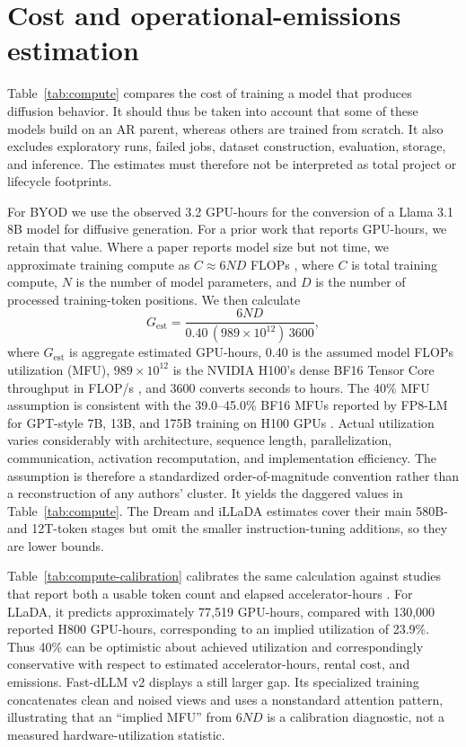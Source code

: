 \documentclass{article}
\begin{document}



\appendix
\section{Cost and operational-emissions estimation}
\label{app:cost}

Table~\ref{tab:compute} compares the cost of training a model that produces diffusion behavior. It should thus be taken into account that some of these models build on an AR parent, whereas others are trained from scratch. It also excludes exploratory runs, failed jobs, dataset construction, evaluation, storage, and inference. The estimates must therefore not be interpreted as total project or lifecycle footprints.

For BYOD we use the observed 3.2 GPU-hours for the conversion of a Llama 3.1 8B model for diffusive generation. For a prior work that reports GPU-hours, we retain that value. Where a paper reports model size but not time, we approximate training compute as $C\approx6ND$ FLOPs \citep{hoffmann2022chinchilla}, where $C$ is total training compute, $N$ is the number of model parameters, and $D$ is the number of processed training-token positions. We then calculate
\begin{equation}
G_{\mathrm{est}}=\frac{6ND}{0.40\,(989\times10^{12})\,3600},
\end{equation}
where $G_{\mathrm{est}}$ is aggregate estimated GPU-hours, 0.40 is the assumed model FLOPs utilization (MFU), $989\times10^{12}$ is the NVIDIA H100's dense BF16 Tensor Core throughput in FLOP/s \citep{nvidiaH100}, and 3600 converts seconds to hours. The 40\% MFU assumption is consistent with the 39.0--45.0\% BF16 MFUs reported by FP8-LM for GPT-style 7B, 13B, and 175B training on H100 GPUs \citep{peng2023fp8lm}. Actual utilization varies considerably with architecture, sequence length, parallelization, communication, activation recomputation, and implementation efficiency. The assumption is therefore a standardized order-of-magnitude convention rather than a reconstruction of any authors' cluster. It yields the daggered values in Table~\ref{tab:compute}. The Dream and iLLaDA estimates cover their main 580B- and 12T-token stages but omit the smaller instruction-tuning additions, so they are lower bounds.

Table~\ref{tab:compute-calibration} calibrates the same calculation against studies that report both a usable token count and elapsed accelerator-hours \citep{nie2025llada,wu2025fastdllmv2}. For LLaDA, it predicts approximately 77,519 GPU-hours, compared with 130,000 reported H800 GPU-hours, corresponding to an implied utilization of 23.9\%. Thus 40\% can be optimistic about achieved utilization and correspondingly conservative with respect to estimated accelerator-hours, rental cost, and emissions. Fast-dLLM v2 displays a still larger gap. Its specialized training concatenates clean and noised views and uses a nonstandard attention pattern, illustrating that an ``implied MFU'' from $6ND$ is a calibration diagnostic, not a measured hardware-utilization statistic.
\end{document}
